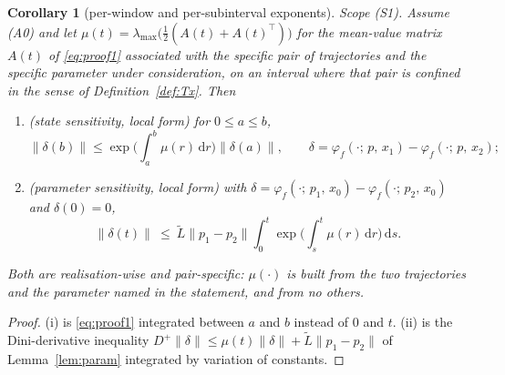 \documentclass[11pt]{article}
\newtheorem{corollary}{Corollary}
\theoremstyle{remark}\newtheorem{remark}{Remark}
\newcommand{\norm}[1]{\lVert #1\rVert}
\newcommand{\flow}[3]{\varphi_f(#1;\,#2,\,#3)}
\newcommand{\dd}{\,\mathrm{d}}
\begin{document}
\begin{corollary}[per-window and per-subinterval exponents]\label{cor:window}
\emph{Scope (S1).} Assume (A0) and let $\mu(t)=\lambda_{\max}\big(\tfrac12(A(t)+A(t)^\top)\big)$ for the mean-value matrix $A(t)$ of \eqref{eq:proof1} associated with \emph{the specific pair of trajectories and the specific parameter under consideration}, on an interval where that pair is confined in the sense of Definition~\ref{def:Tx}. Then
\begin{enumerate}[nosep,label=(\roman*)]
\item (state sensitivity, local form) for $0\le a\le b$,
\begin{equation}
\norm{\delta(b)}\le\exp\Big(\int_a^b\mu(r)\dd r\Big)\norm{\delta(a)},
\qquad \delta=\flow{\cdot}{p}{x_1}-\flow{\cdot}{p}{x_2};
\label{eq:window}
\end{equation}
\item (parameter sensitivity, local form) with $\delta=\flow{\cdot}{p_1}{x_0}-\flow{\cdot}{p_2}{x_0}$ and $\delta(0)=0$,
\begin{equation}
\norm{\delta(t)}\ \le\ \tilde L\norm{p_1-p_2}\int_0^t\exp\Big(\int_s^t\mu(r)\dd r\Big)\dd s .
\label{eq:window_param}
\end{equation}
\end{enumerate}
Both are \emph{realisation-wise and pair-specific}: $\mu(\cdot)$ is built from the two trajectories and the parameter named in the statement, and from no others.
\end{corollary}
\begin{proof}
(i) is \eqref{eq:proof1} integrated between $a$ and $b$ instead of $0$ and $t$. (ii) is the Dini-derivative inequality $D^{+}\norm\delta\le\mu(t)\norm\delta+\tilde L\norm{p_1-p_2}$ of Lemma~\ref{lem:param} integrated by variation of constants.
\end{proof}
\end{document}
